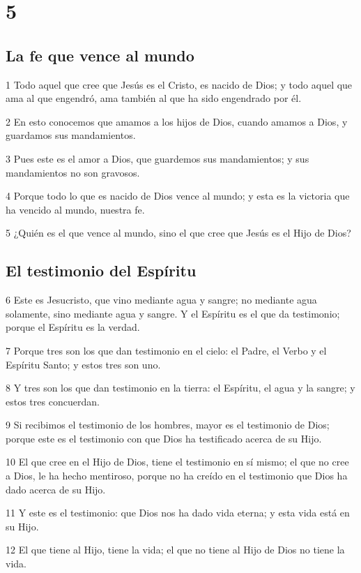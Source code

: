 \chapter{5}

\section*{La fe que vence al mundo}

\par 1 Todo aquel que cree que Jesús es el Cristo, es nacido de Dios; y todo aquel que ama al que engendró, ama también al que ha sido engendrado por él.
\par 2 En esto conocemos que amamos a los hijos de Dios, cuando amamos a Dios, y guardamos sus mandamientos.
\par 3 Pues este es el amor a Dios, que guardemos sus mandamientos; y sus mandamientos no son gravosos.
\par 4 Porque todo lo que es nacido de Dios vence al mundo; y esta es la victoria que ha vencido al mundo, nuestra fe.
\par 5 ¿Quién es el que vence al mundo, sino el que cree que Jesús es el Hijo de Dios?

\section*{El testimonio del Espíritu}

\par 6 Este es Jesucristo, que vino mediante agua y sangre; no mediante agua solamente, sino mediante agua y sangre. Y el Espíritu es el que da testimonio; porque el Espíritu es la verdad.
\par 7 Porque tres son los que dan testimonio en el cielo: el Padre, el Verbo y el Espíritu Santo; y estos tres son uno.
\par 8 Y tres son los que dan testimonio en la tierra: el Espíritu, el agua y la sangre; y estos tres concuerdan.
\par 9 Si recibimos el testimonio de los hombres, mayor es el testimonio de Dios; porque este es el testimonio con que Dios ha testificado acerca de su Hijo.
\par 10 El que cree en el Hijo de Dios, tiene el testimonio en sí mismo; el que no cree a Dios, le ha hecho mentiroso, porque no ha creído en el testimonio que Dios ha dado acerca de su Hijo.
\par 11 Y este es el testimonio: que Dios nos ha dado vida eterna; y esta vida está en su Hijo.
\par 12 El que tiene al Hijo, tiene la vida; el que no tiene al Hijo de Dios no tiene la vida.

